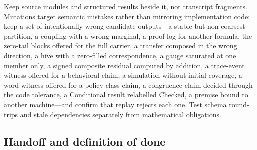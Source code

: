 \documentclass[11pt]{article}
\begin{document}
Keep source modules and structured results beside it, not transcript fragments. Mutations target
semantic mistakes rather than mirroring implementation code: keep a set of intentionally wrong
candidate outputs---a stable but non-coarsest partition, a coupling with a wrong marginal, a proof log
for another formula, the zero-tail blocks offered for the full carrier, a transfer composed in the wrong
direction, a hive with a zero-filled correspondence, a gauge saturated at one member only, a signed
composite residual computed by addition, a trace-event witness offered for a behavioral claim, a
simulation without initial coverage, a word witness offered for a policy-class claim, a congruence
claim decided through the code tolerance, a Conditional result relabelled Checked, a premise bound
to another machine---and confirm that replay rejects each one. Test schema
round-trips and stale dependencies separately from mathematical obligations.

\subsection{Handoff and definition of done}
\end{document}
